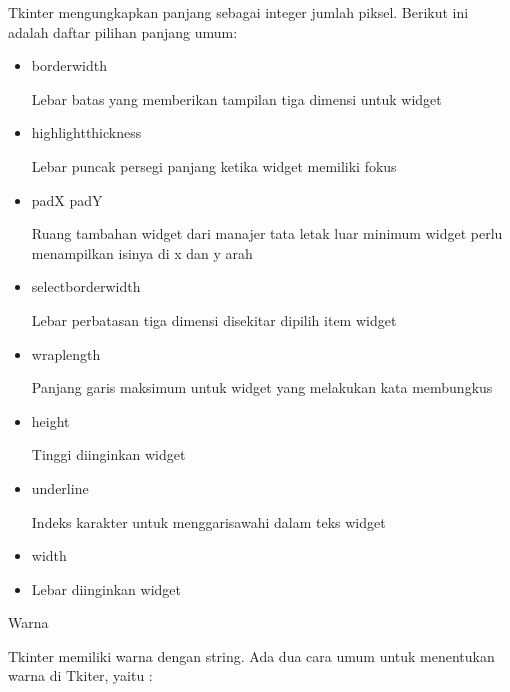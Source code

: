 \documentclass{wileySix}
\begin{document}
\begin{myEnumerate}
\begin{myEnumerate}
{\begin{myEnumerate}
	
	
	
	\hspace*{0.5in} \vspace{12pt}
	\hspace*{0.5in} Tkinter mengungkapkan panjang sebagai integer jumlah piksel. Berikut ini adalah daftar pilihan panjang umum: \par
	\noindent 
	\begin{itemize}
		\item borderwidth \par
		Lebar batas yang memberikan tampilan tiga dimensi untuk widget \par
		\noindent 
		\item highlightthickness \par
		Lebar puncak persegi panjang ketika widget memiliki fokus \par
		\noindent 
		\item padX padY \par
		Ruang tambahan widget dari manajer tata letak luar minimum widget perlu menampilkan isinya di x dan y arah \par
		\noindent 
		\item selectborderwidth \par
		Lebar perbatasan tiga dimensi disekitar dipilih item widget \par
		\noindent 
		\item wraplength \par
		Panjang garis maksimum untuk widget yang melakukan kata membungkus \par
		\noindent 
		\item height \par
		Tinggi diinginkan widget \par
		\noindent 
		\item underline \par
		Indeks karakter untuk menggarisawahi dalam teks widget  \par
		\noindent 
		\item width \par
		\noindent 
		\item Lebar diinginkan widget\end{itemize}
	\par
	\noindent 
	\item Warna \par
	\noindent 
	Tkinter memiliki warna dengan string. Ada dua cara umum untuk menentukan warna di Tkiter, yaitu : \par

\end{myEnumerate}}
\end{myEnumerate}
\end{myEnumerate}
\end{document}
